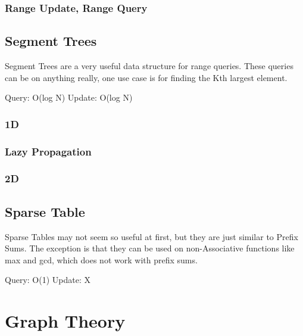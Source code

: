 \documentclass{article}
\begin{document}
\subsubsection{Range Update, Range Query}


\subsection{Segment Trees}

\begin{flushleft}
Segment Trees are a very useful data structure for range queries.
These queries can be on anything really, one use case is for finding the Kth largest element.

Query: O(log N)
Update: O(log N)
\end{flushleft}

\subsubsection{1D}

\subsubsection{Lazy Propagation}

\subsubsection{2D}


\subsection{Sparse Table}

\begin{flushleft}
Sparse Tables may not seem so useful at first, but they are just similar
to Prefix Sums. The exception is that they can be used on non-Associative
functions like max and gcd, which does not work with prefix sums.

Query: O(1)
Update: X
\end{flushleft}




\section{Graph Theory}
\end{document}
